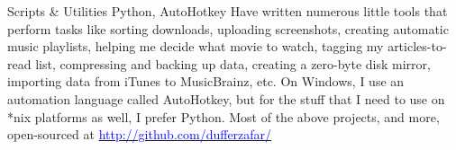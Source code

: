 \cventry{}
    {Scripts \& Utilities}
    {}
    {\scriptsize Python, AutoHotkey}
    {}
    {
        Have written numerous little tools that perform tasks like
        sorting downloads,
        uploading screenshots,
        creating automatic music playlists,
        helping me decide what movie to watch,
        tagging my articles-to-read list,
        compressing and backing up data,
        creating a zero-byte disk mirror,
        importing data from iTunes to MusicBrainz, etc.
        \newline
        On Windows, I use an automation language called AutoHotkey, but for the stuff that I need to use on *nix platforms as well, I prefer Python.
        \newline
        \newline
        Most of the above projects, and more, open-sourced at \href{http://github.com/dufferzafar/}{\textcolor{blue}{http://github.com/dufferzafar/}}
    }
    \vspace*{0.2\baselineskip}
